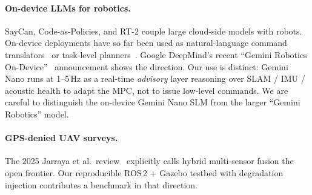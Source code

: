 \paragraph{On-device LLMs for robotics.}
SayCan, Code-as-Policies, and RT-2 couple large cloud-side models with
robots. On-device deployments have so far been used as
natural-language command translators~\cite{px4ollama2025} or task-level
planners~\cite{llmland2025}. Google DeepMind's recent ``Gemini
Robotics On-Device''~\cite{geminirobotics2025} announcement shows the
direction. Our use is distinct: Gemini Nano runs at 1--5\,Hz as a
real-time \emph{advisory} layer reasoning over SLAM / IMU / acoustic
health to adapt the MPC, not to issue low-level commands. We are
careful to distinguish the on-device Gemini Nano SLM from the larger
``Gemini Robotics'' model.

\paragraph{GPS-denied UAV surveys.}
The 2025 Jarraya et al.\ review~\cite{jarraya2025gpsdenied} explicitly
calls hybrid multi-sensor fusion the open frontier. Our reproducible
ROS\,2 + Gazebo testbed with degradation injection contributes a
benchmark in that direction.
